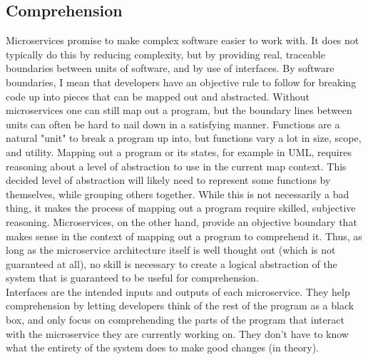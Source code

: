 \subsection{Comprehension}
Microservices promise to make complex software easier to work with.
It does not typically do this by reducing complexity, but by providing real, traceable boundaries between units of software, and by use of interfaces.
By software boundaries, I mean that developers have an objective rule to follow for breaking code up into pieces that can be mapped out and abstracted.
Without microservices one can still map out a program, but the boundary lines between units can often be hard to nail down in a satisfying manner.
Functions are a natural "unit" to break a program up into, but functions vary a lot in size, scope, and utility.
Mapping out a program or its states, for example in UML, requires reasoning about a level of abstraction to use in the current map context.
This decided level of abstraction will likely need to represent some functions by themselves, while grouping others together.
While this is not necessarily a bad thing, it makes the process of mapping out a program require skilled, subjective reasoning.
Microservices, on the other hand, provide an objective boundary that makes sense in the context of mapping out a program to comprehend it.
Thus, as long as the microservice architecture itself is well thought out (which is not guaranteed at all), no skill is necessary to create a logical abstraction of the system that is guaranteed to be useful for comprehension.\\

Interfaces are the intended inputs and outputs of each microservice.
They help comprehension by letting developers think of the rest of the program as a black box, and only focus on comprehending the parts of the program that interact with the microservice they are currently working on.
They don't have to know what the entirety of the system does to make good changes (in theory).

